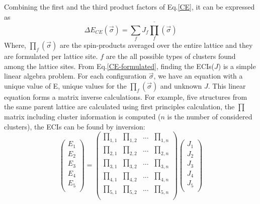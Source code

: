 \documentclass[aps,preprint,amsmath,amssymb]{revtex4}
\begin{document}
Combining the first and the third product factors of Eq.\ref{CE}, it can be expressed as
\begin{equation}\label{CE-formulated}
  \Delta E_{CE}(\vec{\sigma})=\sum_{f}J_{f}\overline{\prod_{f}}(\vec{\sigma})
\end{equation}
Where, $\prod_{f}(\vec{\sigma})$ are the spin-products averaged over the entire lattice and they are formulated per lattice site.
$f$ are the all possible types of clusters found among the lattice sites.
From Eq.\ref{CE-formulated}, finding the ECIs($J$) is a simple linear algebra problem.
For each configuration $\vec{\sigma}$, we have an equation
with a unique value of E, unique values for the $\prod_{f}(\vec{\sigma})$ and unknown $J$.
This linear equation forms a matrix inverse calculations.
For example, five structures from the same parent lattice are calculated using first principles calculation,
the $\prod$ matrix including cluster information is
computed ($n$ is the number of considered clusters), the ECIs can be found by inversion:
\begin{equation}\label{EJ}
  \left(
    \begin{array}{c}
      E_{1} \\
      E_{2} \\
      E_{3} \\
      E_{4} \\
      E_{5} \\
    \end{array}
  \right)=\left(
            \begin{array}{cccc}
              \prod_{1,1} & \prod_{1,2} & ... & \prod_{1,n} \\
              \prod_{2,1} & \prod_{2,2} & ... & \prod_{2,n} \\
              \prod_{3,1} & \prod_{3,2} & ... & \prod_{3,n} \\
              \prod_{4,1} & \prod_{4,2} & ... & \prod_{4,n} \\
              \prod_{5,1} & \prod_{5,2} & ... & \prod_{5,n} \\
            \end{array}
          \right)\left(
                   \begin{array}{c}
                     J_{1} \\
                     J_{2} \\
                     J_{3} \\
                     J_{4} \\
                     J_{5} \\
                   \end{array}
                 \right)
\end{equation}
\end{document}
